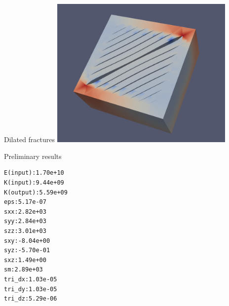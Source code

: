 \begin{frame}{Dilated fractures}
\includegraphics[width=9cm]{png/poromec-dilated-fractures}
\end{frame}

\begin{frame}[fragile]{Preliminary results}
\begin{verbatim}
E(input):1.70e+10
K(input):9.44e+09
K(output):5.59e+09
eps:5.17e-07
sxx:2.82e+03
syy:2.84e+03
szz:3.01e+03
sxy:-8.04e+00
syz:-5.70e-01
sxz:1.49e+00
sm:2.89e+03
tri_dx:1.03e-05
tri_dy:1.03e-05
tri_dz:5.29e-06
\end{verbatim}

\end{frame}

